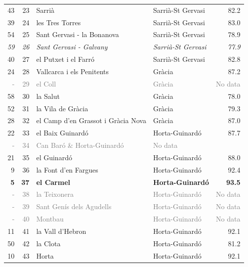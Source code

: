{\begin{longtable}{rrllr}
          43 & 23 & Sarrià & Sarrià-St Gervasi & 82.2 \\
          39 & 24 & les Tres Torres & Sarrià-St Gervasi & 83.0 \\
          54 & 25 & Sant Gervasi - la Bonanova & Sarrià-St Gervasi & 78.9 \\   
          \textit{59} & \textit{26} & \textit{Sant Gervasi - Galvany} & \textit{Sarrià-St Gervasi} & \textit{77.9} \\
          40 & 27 & el Putxet i el Farró & Sarrià-St Gervasi & 82.8 \\
          24 & 28 & Vallcarca i els Penitents & Gràcia & 87.2 \\
          \textcolor{gray}{-} & \textcolor{gray}{29} & \textcolor{gray}{el Coll} & \textcolor{gray}{Gràcia} & \textcolor{gray}{No data} \\
          58 & 30 & la Salut & Gràcia & 78.0 \\
          52 & 31 & la Vila de Gràcia & Gràcia & 79.3 \\
          28 & 32 & el Camp d'en Grassot i Gràcia Nova & Gràcia & 87.0 \\
          22 & 33 & el Baix Guinardó & Horta-Guinardó & 87.7 \\
          \textcolor{gray}{-} & \textcolor{gray}{34} & \textcolor{gray}{Can Baró \& Horta-Guinardó} & \textcolor{gray}{No data} \\
          21 & 35 & el Guinardó & Horta-Guinardó & 88.0 \\
          9 & 36 & la Font d'en Fargues & Horta-Guinardó & 92.4 \\
          \textbf{5} & \textbf{37} & \textbf{el Carmel} & \textbf{Horta-Guinardó} & \textbf{93.5} \\
          \textcolor{gray}{-} & \textcolor{gray}{38} & \textcolor{gray}{la Teixonera} & \textcolor{gray}{Horta-Guinardó} & \textcolor{gray}{No data} \\
          \textcolor{gray}{-} & \textcolor{gray}{39} & \textcolor{gray}{Sant Genís dels Agudells} & \textcolor{gray}{Horta-Guinardó} & \textcolor{gray}{No data} \\
          \textcolor{gray}{-} & \textcolor{gray}{40} & \textcolor{gray}{Montbau} & \textcolor{gray}{Horta-Guinardó} & \textcolor{gray}{No data} \\
          11 & 41 & la Vall d'Hebron & Horta-Guinardó & 92.1 \\
          50 & 42 & la Clota & Horta-Guinardó & 81.2 \\
          10 & 43 & Horta & Horta-Guinardó & 92.1 \\

\end{longtable}}
